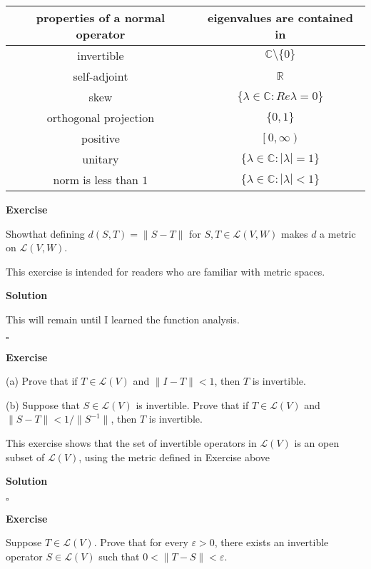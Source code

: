 \documentclass{article}
\newenvironment{exercise}{%
{\textbf{Exercise\\}
    }
}{
}
\newenvironment{solution}{%
{
    \textbf{Solution\\}
    }
}{
  \hfill $\square$ 
  \par\bigskip 
}
\newcommand{\RR}{\mathbb{R}}
\newcommand{\CC}{\mathbb{C}}
\begin{document}
\begin{CJK}{UTF8}{gkai}
\begin{center}
    \begin{tabular}{|c|c|}
        \hline
        properties of a normal operator& eigenvalues are contained in\\
        \hline
        invertible &$\CC\setminus\{0\}$\\
        \hline
        self-adjoint&$\RR$\\
        \hline    
        skew &$\{\lambda \in \CC :Re\lambda=0\}$\\
        \hline
        orthogonal projection&$\{0, 1\}$\\
        \hline
        positive&$\left[0, \infty\right)$\\
        \hline
        unitary &$\{\lambda \in \CC : |\lambda| = 1\}$\\
        \hline    
        norm is less than $1$ &$\{\lambda \in \CC : |\lambda| < 1\}$\\
        \hline
    \end{tabular}
\end{center}

\begin{exercise}
    Showthat defining $d(S,T) = \|S-T\|$ for $S,T \in \mathcal{L}(V,W)$ makes $d$ a metric on $\mathcal{L}(V,W)$.

    This exercise is intended for readers who are familiar with metric spaces.
\end{exercise}

\begin{solution}
    This will remain until I learned the function analysis.
\end{solution}

\begin{exercise}
    (a) Prove that if $T \in \mathcal{L}(V)$ and $\|I -T\| < 1$, then $T$ is invertible.

    (b) Suppose that $S \in \mathcal{L}(V)$ is invertible. Prove that if $T \in \mathcal{L}(V)$ and $\|S -T\| < 1/\|S^{-1}\|$, then $T$ is invertible.

    This exercise shows that the set of invertible operators in $\mathcal{L}(V)$ is an open subset of $\mathcal{L}(V)$, using the metric defined in Exercise above
\end{exercise}

\begin{solution}

\end{solution}

\begin{exercise}
    Suppose $T \in \mathcal{L}(V)$. Prove that for every $\varepsilon > 0$, there exists an invertible operator $S \in \mathcal{L}(V)$ such that $0 < \|T -S\| < \varepsilon$.
\end{exercise}


\end{CJK}
\end{document}
